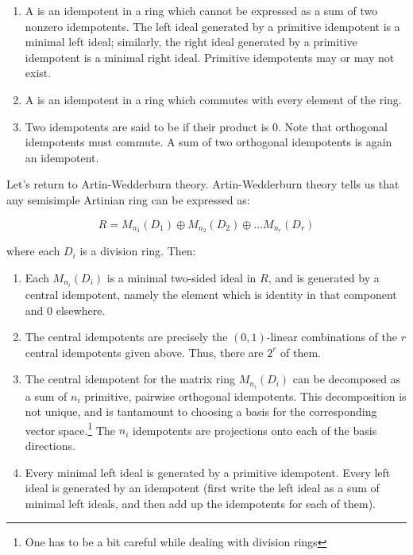 \documentclass[a4paper]{amsart}
\begin{document}
\begin{enumerate}

\item A  is an idempotent in a
  ring which cannot be expressed as a sum of two nonzero
  idempotents. The left ideal generated by a primitive idempotent is a
  minimal left ideal; similarly, the right ideal generated by a
  primitive idempotent is a minimal right ideal. Primitive idempotents
  may or may not exist.

\item A  is an idempotent in a
  ring which commutes with every element of the ring.

\item Two idempotents are said to be
   if their product is $0$.
  Note that orthogonal idempotents must commute. A sum of two orthogonal 
  idempotents is again an idempotent.

\end{enumerate}

Let's return to Artin-Wedderburn theory. Artin-Wedderburn theory tells
us that any semisimple Artinian ring can be expressed as:

$$R = M_{n_1}(D_1) \oplus M_{n_2}(D_2) \oplus \ldots M_{n_r}(D_r)$$

where each $D_i$ is a division ring. Then:

\begin{enumerate}

\item Each $M_{n_i}(D_i)$ is a minimal two-sided ideal in $R$, and is
  generated by a central idempotent, namely the element which is
  identity in that component and $0$ elsewhere.

\item The central idempotents are precisely the $(0,1)$-linear
  combinations of the $r$ central idempotents given above. Thus, there
  are $2^r$ of them.

\item The central idempotent for the matrix ring $M_{n_i}(D_i)$ can be
  decomposed as a sum of $n_i$ primitive, pairwise orthogonal
  idempotents. This decomposition is not unique, and is tantamount to
  choosing a basis for the corresponding vector space.\footnote{One
    has to be a bit careful while dealing with division rings} The
  $n_i$ idempotents are projections onto each of the basis directions.

\item Every minimal left ideal is generated by a primitive idempotent.
  Every left ideal is generated by an idempotent (first write the left
  ideal as a sum of minimal left ideals, and then add up the
  idempotents for each of them).
\end{enumerate}
\end{document}
